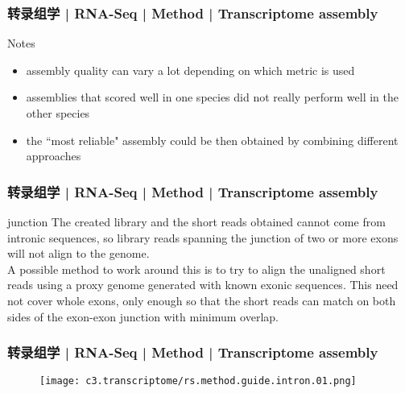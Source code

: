 \begin{frame}
  \frametitle{转录组学 | RNA-Seq | Method | Transcriptome assembly}
  \begin{block}{Notes}
    \begin{itemize}
      \item assembly quality can vary a lot depending on which metric is used
      \item assemblies that scored well in one species did not really perform well in the other species
      \item the ``most reliable" assembly could be then obtained by combining different approaches
    \end{itemize}
  \end{block}
\end{frame}

\begin{frame}
  \frametitle{转录组学 | RNA-Seq | Method | Transcriptome assembly}
  \begin{block}{junction}
 The created library and the short reads obtained cannot come from intronic sequences, so library reads spanning the junction of two or more exons will not align to the genome.\\
 \vspace{1em}
 A possible method to work around this is to try to align the unaligned short reads using a proxy genome generated with known exonic sequences. This need not cover whole exons, only enough so that the short reads can match on both sides of the exon-exon junction with minimum overlap.
  \end{block}
\end{frame}

\begin{frame}
  \frametitle{转录组学 | RNA-Seq | Method | Transcriptome assembly}
  \begin{figure}
    \centering
    \texttt{[image: c3.transcriptome/rs.method.guide.intron.01.png]}
  \end{figure}
\end{frame}

